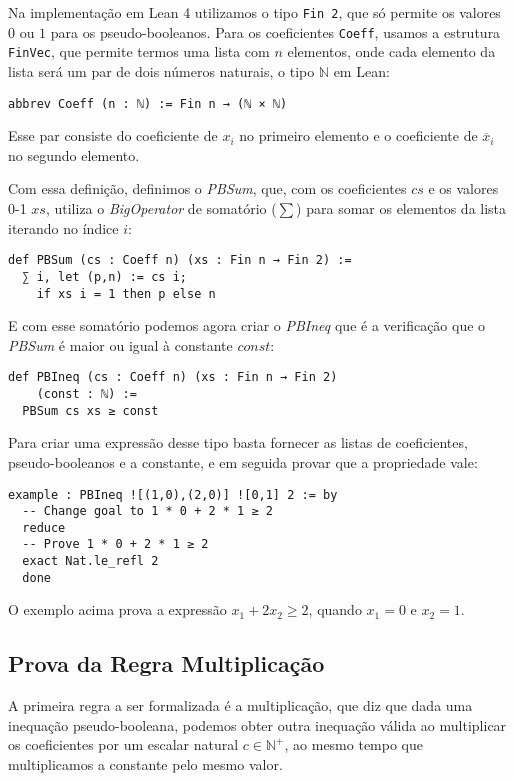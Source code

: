 \documentclass[conference]{IEEEtran}
\begin{document}
Na implementação em Lean 4 utilizamos o tipo \texttt{Fin 2}, que só permite os valores $0$ ou $1$
para os pseudo-booleanos.
Para os coeficientes \texttt{Coeff}, usamos a estrutura \texttt{FinVec},
que permite termos uma lista com $n$ elementos, onde cada elemento da lista será um par
de dois números naturais, o tipo $\mathbb{N}$ em Lean:
\begin{verbatim}
abbrev Coeff (n : ℕ) := Fin n → (ℕ × ℕ)
\end{verbatim}

Esse par consiste do coeficiente de $x_i$ no primeiro elemento e
o coeficiente de $\overline x_i$ no segundo elemento.

Com essa definição, definimos o \textit{PBSum}, que, com os coeficientes $cs$ e os valores 0-1 $xs$,
utiliza o \textit{BigOperator} de somatório ($\sum$) para somar os elementos da lista iterando no índice $i$:
\begin{verbatim}
def PBSum (cs : Coeff n) (xs : Fin n → Fin 2) :=
  ∑ i, let (p,n) := cs i;
    if xs i = 1 then p else n
\end{verbatim}

E com esse somatório podemos agora criar o \textit{PBIneq} que é a verificação que o \textit{PBSum}
é maior ou igual à constante $const$:
\begin{verbatim}
def PBIneq (cs : Coeff n) (xs : Fin n → Fin 2)
    (const : ℕ) :=
  PBSum cs xs ≥ const
\end{verbatim}

Para criar uma expressão desse tipo basta fornecer as listas de coeficientes, pseudo-booleanos e a constante,
e em seguida provar que a propriedade vale:
\begin{verbatim}
example : PBIneq ![(1,0),(2,0)] ![0,1] 2 := by
  -- Change goal to 1 * 0 + 2 * 1 ≥ 2
  reduce               
  -- Prove 1 * 0 + 2 * 1 ≥ 2
  exact Nat.le_refl 2  
  done
\end{verbatim}

O exemplo acima prova a expressão $x_1 + 2 x_2 \ge 2$, quando $x_1 = 0$ e $x_2 = 1$.


\subsection{Prova da Regra Multiplicação}
A primeira regra a ser formalizada é a multiplicação, que diz que dada uma inequação pseudo-booleana, podemos obter
outra inequação válida ao multiplicar os coeficientes por um escalar natural $c \in \mathbb{N}^+ $, ao mesmo tempo que multiplicamos
a constante pelo mesmo valor.
\end{document}
